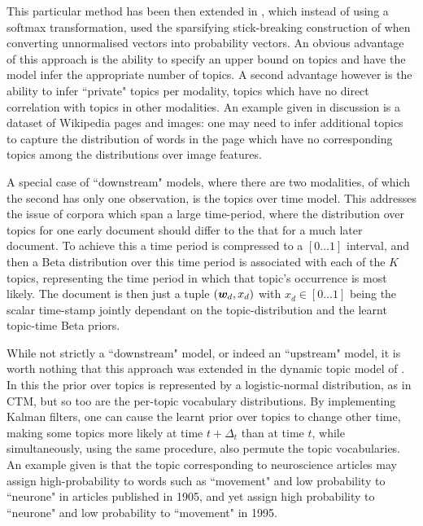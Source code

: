 This particular method has been then extended in \cite{Virtanen2012a}, which instead of using a softmax transformation, used the sparsifying stick-breaking construction of \cite{Paisley2012} when converting unnormalised vectors into probability vectors. An obvious advantage of this approach is the ability to specify an upper bound on topics and have the model infer the appropriate number of topics. A second advantage however is the ability to infer ``private" topics per modality, topics which have no direct correlation with topics in other modalities. An example given in discussion is a dataset of Wikipedia pages and images: one may need to infer additional topics to capture the distribution of words in the page which have no corresponding topics among the distributions over image features.

A special case of ``downstream" models, where there are two modalities, of which the second has only one observation, is the topics over time model\cite{Wang2006}. This addresses the issue of corpora which span a large time-period, where the distribution over topics for one early document should differ to the that for a much later document. To achieve this a time period is compressed to a $[0\ldots 1]$ interval, and then a Beta distribution over this time period is associated with each of the $K$ topics, representing the time period in which that topic's occurrence is most likely. The document is then just a tuple $(\bm w_d, x_d)$ with $x_d \in [0\ldots 1]$ being the scalar time-stamp jointly dependant on the topic-distribution and the learnt topic-time Beta priors.

While not strictly a ``downstream" model, or indeed an ``upstream" model, it is worth nothing that this approach was extended in the dynamic topic model of \cite{Blei2006a}. In this the prior over topics is represented by a logistic-normal distribution, as in CTM, but so too are the per-topic vocabulary distributions. By implementing Kalman filters, one can cause the learnt prior over topics to change other time, making some topics more likely at time $t + \Delta_t$ than at time $t$, while simultaneously, using the same procedure, also permute the topic vocabularies. An example given is that the topic corresponding to neuroscience articles may assign high-probability to words such as ``movement" and low probability to ``neurone" in articles published in 1905, and yet assign high probability to ``neurone" and low probability to ``movement" in 1995.

